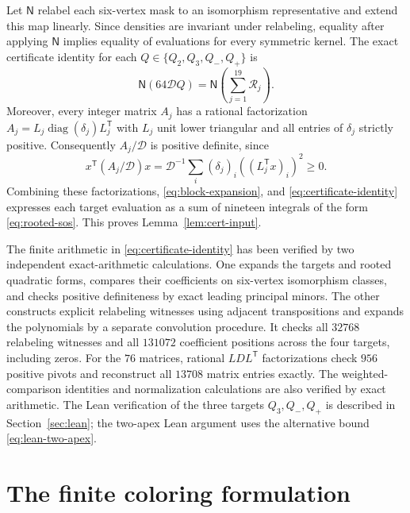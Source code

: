 \documentclass[11pt,a4paper]{article}
\theoremstyle{remark}
\numberwithin{equation}{section}
\DeclareMathOperator{\diag}{diag}
\begin{document}
Let $\mathsf N$ relabel each six-vertex mask to an isomorphism
representative and extend this map linearly. Since densities are
invariant under relabeling, equality after applying $\mathsf N$
implies equality of evaluations for every symmetric kernel.
The exact certificate identity for each
$Q\in\{Q_2,Q_3,Q_-,Q_+\}$ is
\begin{equation}\label{eq:certificate-identity}
 \mathsf N(64\mathscr D Q)=
 \mathsf N\left(\sum_{j=1}^{19}\mathcal R_j\right).
\end{equation}
Moreover, every integer matrix $A_j$ has a rational factorization
$A_j=L_j\diag(\delta_j)L_j^{\mathsf T}$ with $L_j$ unit lower
triangular and all entries of $\delta_j$ strictly positive.
Consequently $A_j/\mathscr D$ is positive definite, since
\[
 x^{\mathsf T}(A_j/\mathscr D)x
   =\mathscr D^{-1}\sum_i(\delta_j)_i
                       ((L_j^{\mathsf T}x)_i)^2\geq0.
\]
Combining these factorizations, \eqref{eq:block-expansion}, and
\eqref{eq:certificate-identity} expresses each target evaluation
as a sum of nineteen integrals of the form
\eqref{eq:rooted-sos}. This proves Lemma~\ref{lem:cert-input}.

The finite arithmetic in \eqref{eq:certificate-identity} has
been verified by two independent exact-arithmetic calculations.
One expands the targets and rooted quadratic forms, compares
their coefficients on six-vertex isomorphism classes, and checks
positive definiteness by exact leading principal minors.
The other constructs explicit relabeling witnesses using
adjacent transpositions and expands the polynomials by a separate
convolution procedure. It checks all $32768$ relabeling witnesses
and all $131072$ coefficient positions across the four targets,
including zeros. For the $76$ matrices, rational
$LDL^{\mathsf T}$ factorizations check $956$ positive pivots
and reconstruct all $13708$ matrix entries exactly.
The weighted-comparison identities and normalization calculations
are also verified by exact arithmetic. The Lean verification
of the three targets $Q_3,Q_-,Q_+$ is described in
Section~\ref{sec:lean}; the two-apex Lean argument uses the
alternative bound \eqref{eq:lean-two-apex}.

\section{The finite coloring formulation}\label{app:finite}
\end{document}
